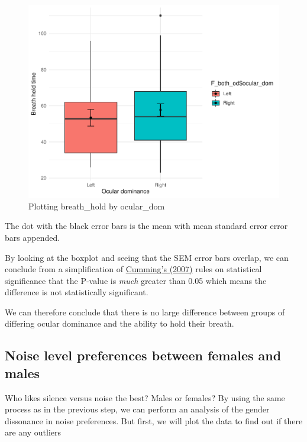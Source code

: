 \documentclass[]{article}
\begin{document}
\begin{figure}
\centering
\includegraphics{Personality-Data-Analysis-Portfolio-1_files/figure-latex/unnamed-chunk-3-1.pdf}
\caption{\label{fig:unnamed-chunk-3}Plotting breath\_hold by ocular\_dom}
\end{figure}

The dot with the black error bars is the mean with mean standard error error bars appended.

By looking at the boxplot and seeing that the SEM error bars overlap, we can conclude from a simplification of \href{https://www.graphpad.com/support/faq/spanwhat-you-can-conclude-when-two-error-bars-overlap-or-dontspan/}{Cumming's (2007)} rules on statistical significance that the P-value is \emph{much} greater than 0.05 which means the difference is not statistically significant.

We can therefore conclude that there is no large difference between groups of differing ocular dominance and the ability to hold their breath.

\hypertarget{noise-level-preferences-between-females-and-males}{%
\subsection{Noise level preferences between females and males}\label{noise-level-preferences-between-females-and-males}}

Who likes silence versus noise the best? Males or females? By using the same process as in the previous step, we can perform an analysis of the gender dissonance in noise preferences. But first, we will plot the data to find out if there are any outliers
\end{document}
